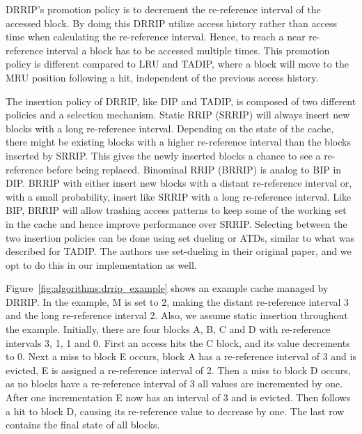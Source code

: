 DRRIP's promotion policy is to decrement the re-reference interval of the accessed block.
By doing this DRRIP utilize access history rather than access time when calculating the re-reference interval.
Hence, to reach a near re-reference interval a block has to be accessed multiple times.
This promotion policy is different compared to LRU and TADIP, where a block will move to the MRU position following a hit, independent of the previous access history.

The insertion policy of DRRIP, like DIP and TADIP, is composed of two different policies and a selection mechanism.
Static RRIP (SRRIP) will always insert new blocks with a long re-reference interval. 
Depending on the state of the cache, there might be existing blocks with a higher re-reference interval than the blocks inserted by SRRIP.
This gives the newly inserted blocks a chance to see a re-reference before being replaced.
Binominal RRIP (BRRIP) is analog to BIP in DIP.
BRRIP with either insert new blocks with a distant re-reference interval or, with a small probability, insert like SRRIP with a long re-reference interval.
Like BIP, BRRIP will allow trashing access patterns to keep some of the working set in the cache and hence improve performance over SRRIP.
Selecting between the two insertion policies can be done using set dueling or ATDs, similar to what was described for TADIP.
The authors use set-dueling in their original paper, and we opt to do this in our implementation as well.

Figure~\ref{fig:algorithms:drrip_example} shows an example cache managed by DRRIP.
In the example, M is set to 2, making the distant re-reference interval 3 and the long re-reference interval 2. 
Also, we assume static insertion throughout the example.
Initially, there are four blocks A, B, C and D with re-reference intervals 3, 1, 1 and 0.
First an access hits the C block, and its value decrements to 0.
Next a miss to block E occurs, block A has a re-reference interval of 3 and is evicted, E is assigned a re-reference interval of 2.
Then a miss to block D occurs, as no blocks have a re-reference interval of 3 all values are incremented by one.
After one incrementation E now has an interval of 3 and is evicted.
Then follows a hit to block D, causing its re-reference value to decrease by one.
The last row contains the final state of all blocks.